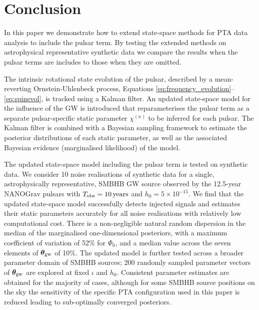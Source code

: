 \documentclass[fleqn,usenatbib,useAMS]{mnras}
\begin{document}
\section{Conclusion}\label{sec:discussion}
In this paper we demonstrate how to extend state-space methods for PTA data analysis to include the pulsar term. By testing the extended methods on astrophysical representative synthetic data we compare the results when the pulsar terms are includes to those when they are omitted.  \newline 


The intrinsic rotational state evolution of the pulsar, described by a mean-reverting Ornstein-Uhlenbeck process, Equations \eqref{eq:frequency_evolution}--\eqref{eq:spinevol}, is tracked using a Kalman filter. An updated state-space model for the influence of the GW is introduced that reparameterises the pulsar term as a separate pulsar-specific static parameter $\chi^{(n)}$ to be inferred for each pulsar. The Kalman filter is combined with a Bayesian sampling framework to estimate the posterior distributions of each static parameter, as well as the associated Bayesian evidence (marginalised likelihood) of the model. \newline 


The updated state-space model including the pulsar term is tested on synthetic data. We consider 10 noise realisations of synthetic data for a single, astrophysically representative, SMBHB GW source observed by the 12.5-year NANOGrav pulsars with $T_{\rm obs} = 10 \, {\rm years}$ and $h_0 = 5 \times 10^{-15}$. We find that the updated state-space model successfully detects injected signals and estimates their static parameters accurately for all noise realisations with relatively low computational cost. There is a non-negligible natural random dispersion in the median of the marginalised one-dimensional posteriors, with a maximum coefficient of variation of 52\% for $\Phi_0$, and a median value across the seven elements of $\boldsymbol{\theta}_{\rm gw}$ of 10\%. The updated model is further tested across a broader parameter domain of SMBHB sources; 200 randomly sampled parameter vectors of $\boldsymbol{\theta}_{\rm gw}$ are explored at fixed $\iota$ and $h_0$. Consistent parameter estimates are obtained for the majority of cases, although for some SMBHB source positions on the sky the sensitivity of the specific PTA configuration used in this paper is reduced leading to sub-optimally converged posteriors. \newline 
\end{document}
